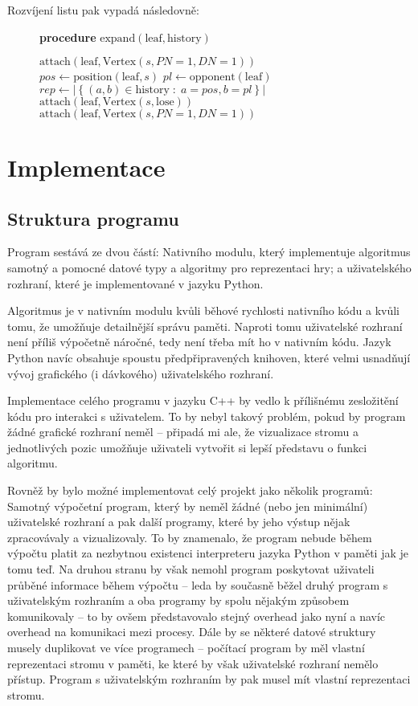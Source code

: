 \documentclass{article}
\begin{document}
Rozvíjení listu pak vypadá následovně:
\begin{figure}[H]
{\bf procedure} $\text{expand}(\text{leaf}, \text{history})$
\begin{algorithmic}
		\STATE $\text{attach}(\text{leaf}, \text{Vertex}(s, PN=1, DN=1))$
	\ELSE
		\STATE $pos \gets \text{position}(\text{leaf}, s)$
		\STATE $pl \gets \text{opponent}(\text{leaf})$
		\STATE $rep \gets \left|\left\{ (a, b) \in \text{history} \;:\; a = pos, b = pl \right\}\right|$
			\STATE $\text{attach}(\text{leaf}, \text{Vertex}(s, \text{lose}))$
		\ELSE
			\STATE $\text{attach}(\text{leaf}, \text{Vertex}(s, PN=1, DN=1))$
		\ENDIF
	\ENDIF
\ENDFOR
\end{algorithmic}
\end{figure}

\section{Implementace}
\subsection{Struktura programu}
Program sestává ze dvou částí: Nativního modulu, který implementuje algoritmus samotný a pomocné datové typy a algoritmy
pro reprezentaci hry; a uživatelského rozhraní, které je implementované v jazyku Python.

Algoritmus je v nativním modulu kvůli běhové rychlosti nativního kódu a kvůli tomu, že umožňuje detailnější správu
paměti. Naproti tomu uživatelské rozhraní není příliš výpočetně náročné, tedy není třeba mít ho v nativním kódu. Jazyk
Python navíc obsahuje spoustu předpřipravených knihoven, které velmi usnadňují vývoj grafického (i dávkového)
uživatelského rozhraní.

Implementace celého programu v jazyku C++ by vedlo k přílišnému zesložitění kódu pro interakci s uživatelem. To by nebyl
takový problém, pokud by program žádné grafické rozhraní neměl -- připadá mi ale, že vizualizace stromu a jednotlivých
pozic umožňuje uživateli vytvořit si lepší představu o funkci algoritmu.

Rovněž by bylo možné implementovat celý projekt jako několik programů: Samotný výpočetní program, který by neměl žádné
(nebo jen minimální) uživatelské rozhraní a pak další programy, které by jeho výstup nějak zpracovávaly a vizualizovaly.
To by znamenalo, že program nebude během výpočtu platit za nezbytnou existenci interpreteru jazyka Python v paměti jak
je tomu teď. Na druhou stranu by však nemohl program poskytovat uživateli průběné informace během výpočtu -- leda by
současně běžel druhý program s uživatelským rozhraním a oba programy by spolu nějakým způsobem komunikovaly -- to by
ovšem představovalo stejný overhead jako nyní a navíc overhead na komunikaci mezi procesy. Dále by se některé datové
struktury musely duplikovat ve více programech -- počítací program by měl vlastní reprezentaci stromu v paměti, ke které
by však uživatelské rozhraní nemělo přístup. Program s uživatelským rozhraním by pak musel mít vlastní reprezentaci
stromu.
\end{document}
